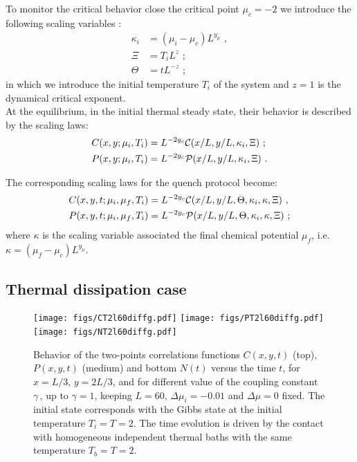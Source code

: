 \documentclass[pra,twocolumn,preprintnumbers,amsmath,amssymb,nofootinbib,floatfix,longbibliography]{revtex4}
\begin{document}
To monitor the critical behavior close the critical point
$\mu_c = -2$ we introduce the following scaling variables
\cite{TV21, BD22}:
\begin{align}
	\label{scalvar}
	\kappa_i & = (\mu_i - \mu_c) L^{y_{\mu}} \,\,, \\
	\Xi & = T_i L^{z} \,\,;\\
    \Theta & = t L^{-z} \,\,;
\end{align}
in which we introduce the initial
temperature $T_i$ of the system and $z=1$ is the dynamical
critical exponent.\\
At the equilibrium, in the initial thermal steady state,
their behavior is described by the scaling laws:
\begin{align}
	\label{scalTcorr}
	C(x,y;\mu_i,T_i)&=L^{-2y_c}{\cal C}(x/L, y/L, \kappa_i,
    \Xi) \,\,;\\
	P(x,y;\mu_i,T_i)&=L^{-2y_c}{\cal P}(x/L, y/L, \kappa_i,
                                     \Xi) \,\,.
\end{align}

The corresponding scaling laws for the quench protocol
become:
\begin{align}
  \label{scalTquench}
  C(x,y,t;\mu_i,\mu_f,T_i) & = L^{-2y_c} {\cal C}(x/L,y/L,
  \Theta,\kappa_i,\kappa, \Xi) \,\,,\\
  P(x,y,t;\mu_i,\mu_f,T_i) & = L^{-2y_c} {\cal P}(x/L, y/L,
  \Theta,\kappa_i,\kappa, \Xi) \,\,;
\end{align}
where $\kappa$ is the scaling variable associated the
final chemical potential $\mu_f$, i.e.
$\kappa = (\mu_f - \mu_c) L^{y_{\mu}}$.

\subsection{Thermal dissipation case}

\begin{figure}[!h]

  \texttt{[image: figs/CT2l60diffg.pdf]}
  \texttt{[image: figs/PT2l60diffg.pdf]}
  \texttt{[image: figs/NT2l60diffg.pdf]}
  \caption{Behavior of the two-points
    correlations functions $C(x,y,t)$ (top), $P(x,y,t)$
    (medium) and bottom $N(t)$ versus the time $t$,
    for $x=L/3$, $y=2L/3$, and for different value
    of the coupling constant $\gamma\,$, up to $\gamma=1$,
    keeping $L=60$, $\Delta \mu_i = -0.01$
    and $\Delta \mu = 0$ fixed.
    The initial state corresponds with the Gibbs state at
    the initial temperature $T_i = T = 2$.
    The time evolution is driven by the contact with
    homogeneous independent thermal baths with the same
    temperature $T_b = T = 2$.
  }
  \label{diffg}
\end{figure}
\end{document}
